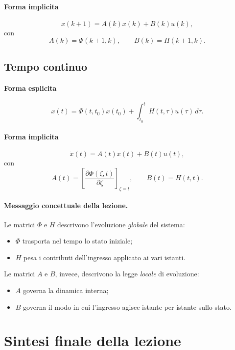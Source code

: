 \paragraph{Forma implicita}
\[
x(k+1)=A(k)x(k)+B(k)u(k),
\]
con
\[
A(k)=\Phi(k+1,k),\qquad B(k)=H(k+1,k).
\]

\subsection{Tempo continuo}

\paragraph{Forma esplicita}
\[
x(t)=\Phi(t,t_0)x(t_0)+\int_{t_0}^{t}H(t,\tau)u(\tau)\,d\tau.
\]

\paragraph{Forma implicita}
\[
\dot x(t)=A(t)x(t)+B(t)u(t),
\]
con
\[
A(t)=\left[\frac{\partial \Phi(\zeta,t)}{\partial \zeta}\right]_{\zeta=t},
\qquad
B(t)=H(t,t).
\]

\paragraph{Messaggio concettuale della lezione.}
Le matrici $\Phi$ e $H$ descrivono l'evoluzione \emph{globale} del sistema:
\begin{itemize}
    \item $\Phi$ trasporta nel tempo lo stato iniziale;
    \item $H$ pesa i contributi dell'ingresso applicato ai vari istanti.
\end{itemize}

Le matrici $A$ e $B$, invece, descrivono la legge \emph{locale} di evoluzione:
\begin{itemize}
    \item $A$ governa la dinamica interna;
    \item $B$ governa il modo in cui l'ingresso agisce istante per istante sullo stato.
\end{itemize}

\section{Sintesi finale della lezione}

